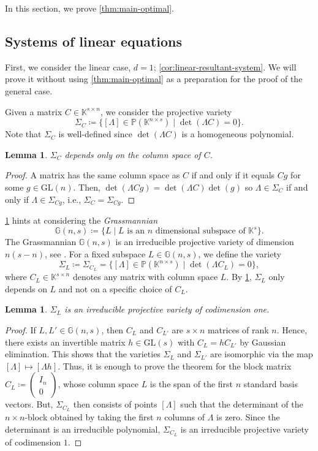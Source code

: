 \documentclass[11pt,a4paper]{article}
\newtheorem{lemma}[theorem]{Lemma}\AddToHook{env/lemma/begin}{\crefalias{theorem}{lemma}}
\numberwithin{equation}{section}
\newcommand{\PP}{\mathbb{P}}
\newcommand{\GG}{\mathbb{G}}
\newcommand{\KK}{\mathbb{K}}
\newcommand{\GL}{\mathrm{GL}}
\begin{document}
In this section, we prove 
\cref{thm:main-optimal}.
\subsection{Systems of linear equations}
\label{sec:linear-case}
First, we consider the linear case, $d=1$; \cref{cor:linear-resultant-system}.
We will prove it without using \cref{thm:main-optimal} as a preparation for the proof of the general case. 


Given a matrix $C\in\KK^{s\times n}$, we consider the projective variety \[
\Sigma_C \coloneqq \{[\Lambda]\in\PP(\KK^{n\times s})\mid \det(\Lambda C)=0\}.
\] Note that $\Sigma_C$ is well-defined since $\det(\Lambda C)$ is a homogeneous polynomial.
\begin{lemma}
\label{lem:grassmannian}
$\Sigma_C$ depends only on the column space of $C$.
\end{lemma}
\begin{proof}
A matrix has the same column space as $C$ if and only if it equals $Cg$ for some $g\in \GL(n)$.
Then, $\det(\Lambda Cg)=\det(\Lambda C)\det(g)$ so $\Lambda \in \Sigma_C$ if and only if $\Lambda \in\Sigma_{Cg}$, i.e., $\Sigma_C=\Sigma_{Cg}$.
\end{proof}
\cref{lem:grassmannian} hints at considering the \emph{Grassmannian} \[
\GG(n,s) \coloneqq \{ L \mid L\text{ is an }n\text{ dimensional subspace of }\KK^s\}.
\] 
The Grassmannian $\GG(n,s)$ is an irreducible projective variety of dimension $n(s-n)$, see \cite[Lectures 6 and 11]{Harris-93}.
For a fixed subspace $L\in\GG(n,s)$, we define the variety \[
\Sigma_L\coloneqq \Sigma_{C_L}= \{ [\Lambda]\in\PP(\KK^{n\times s}) \mid \det(\Lambda C_L)=0 \},
\]
where $C_L\in\KK^{s\times n}$ denotes any matrix with column space $L$.
By \cref{lem:grassmannian}, $\Sigma_L$ only depends on $L$ and not on a specific choice of $C_L$.


\begin{lemma}
\label{lem:det-codim}
$\Sigma_L$ is an irreducible projective variety of codimension one.
\end{lemma}
\begin{proof}
If $L,L'\in\GG(n,s)$, then $C_L$ and $C_{L'}$ are $s\times n$ matrices of rank $n$.
Hence, there exists an invertible matrix $h\in\GL(s)$ with $C_L=hC_{L'}$ by Gaussian elimination.
This shows that the varieties $\Sigma_L$ and $\Sigma_{L'}$ are isomorphic via the map $[\Lambda]\mapsto [\Lambda h]$.
Thus, it is enough to prove the theorem for the block matrix $C_L\coloneqq\begin{pmatrix}
    I_n \\
    0
\end{pmatrix}$, whose column space $L$ is the span of the first $n$ standard basis vectors.
But, $\Sigma_{C_L}$ then consists of points $[\Lambda]$ such that the determinant of the $n\times n$-block obtained by taking the first $n$ columns of $\Lambda$ is zero.
Since the determinant is an irreducible polynomial, $\Sigma_{C_L}$ is an irreducible projective variety of codimension $1$.
\end{proof}
\end{document}
